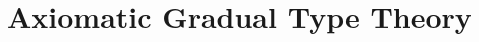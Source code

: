 \documentclass[acmsmall,screen,12pt]{acmart}
\newcommand{\cbpv}{CBPV}
\newcommand{\ltdyn}{\sqsubseteq}
\newcommand{\uarrow}{\mathrel{\rotatebox[origin=c]{-30}{$\leftarrowtail$}}}
\newcommand{\darrow}{\mathrel{\rotatebox[origin=c]{30}{$\twoheadleftarrow$}}}
\newcommand{\upcast}[2]{\langle{#2}\uarrow{#1}\rangle}
\newcommand{\dncast}[2]{\langle{#1}\darrow{#2}\rangle}
\newcommand{\err}{\mho}
\begin{document}



\section{Axiomatic Gradual Type Theory}
\label{sec:gtt}
\end{document}
